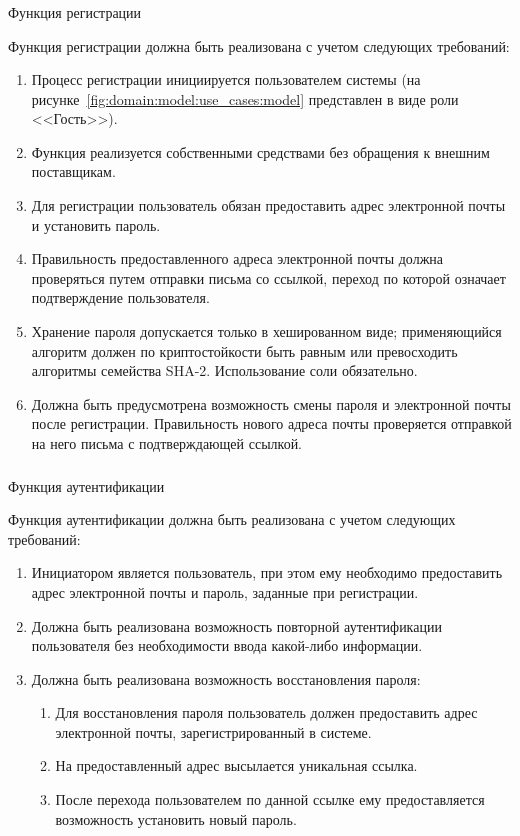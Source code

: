 \subsubsection{} Функция регистрации
\label{sec:domain:specification:signup}

Функция регистрации должна быть реализована с учетом следующих требований:

\begin{enumerate}
	\item Процесс регистрации инициируется пользователем системы (на рисунке~\ref{fig:domain:model:use_cases:model} представлен в виде роли <<Гость>>).
	\item Функция реализуется собственными средствами без обращения к вне\-ш\-ним поставщикам.
	\item Для регистрации пользователь обязан предоставить адрес электронной почты и установить пароль.
	\item Правильность предоставленного адреса электронной почты должна проверяться путем отправки письма со ссылкой, переход по которой означает подтверждение пользователя.
	\item Хранение пароля допускается только в хешированном виде; применяющийся алгоритм должен по криптостойкости быть равным или превосходить алгоритмы семейства SHA-2. Использование соли обязательно.
	\item Должна быть предусмотрена возможность смены пароля и электронной почты после регистрации. Правильность нового адреса почты проверяется отправкой на него письма с подтверждающей ссылкой.
\end{enumerate}

\subsubsection{} Функция аутентификации
\label{sec:domain:specification:authentication}

Функция аутентификации должна быть реализована с учетом следующих требований:

\begin{enumerate}
	\item Инициатором является пользователь, при этом ему необходимо предоставить адрес электронной почты и пароль, заданные при регистрации.
	\item Должна быть реализована возможность повторной аутентификации пользователя без необходимости ввода какой-либо информации.
	\item Должна быть реализована возможность восстановления пароля:
	\begin{enumerate}
		\item Для восстановления пароля пользователь должен предоставить адрес электронной почты, зарегистрированный в системе.
		\item На предоставленный адрес высылается уникальная ссылка.
		\item После перехода пользователем по данной ссылке ему предоставляется возможность установить новый пароль.
	\end{enumerate}
\end{enumerate}

